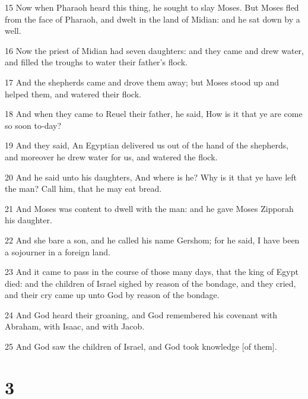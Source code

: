 \par 15 Now when Pharaoh heard this thing, he sought to slay Moses. But Moses fled from the face of Pharaoh, and dwelt in the land of Midian: and he sat down by a well.
\par 16 Now the priest of Midian had seven daughters: and they came and drew water, and filled the troughs to water their father's flock.
\par 17 And the shepherds came and drove them away; but Moses stood up and helped them, and watered their flock.
\par 18 And when they came to Reuel their father, he said, How is it that ye are come so soon to-day?
\par 19 And they said, An Egyptian delivered us out of the hand of the shepherds, and moreover he drew water for us, and watered the flock.
\par 20 And he said unto his daughters, And where is he? Why is it that ye have left the man? Call him, that he may eat bread.
\par 21 And Moses was content to dwell with the man: and he gave Moses Zipporah his daughter.
\par 22 And she bare a son, and he called his name Gershom; for he said, I have been a sojourner in a foreign land.
\par 23 And it came to pass in the course of those many days, that the king of Egypt died: and the children of Israel sighed by reason of the bondage, and they cried, and their cry came up unto God by reason of the bondage.
\par 24 And God heard their groaning, and God remembered his covenant with Abraham, with Isaac, and with Jacob.
\par 25 And God saw the children of Israel, and God took knowledge [of them].

\chapter{3}

